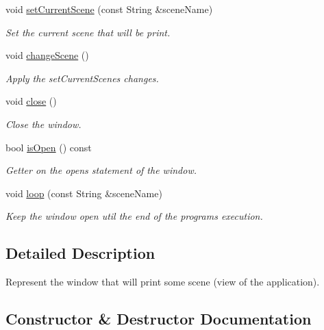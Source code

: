 \begin{DoxyCompactItemize}
void \hyperlink{classWindow_a3342dc02339a5974d5c6fcefd91d0cbf}{set\+Current\+Scene} (const String \&scene\+Name)
\begin{DoxyCompactList}\small\item\em Set the current scene that will be print. \end{DoxyCompactList}\item 
\mbox{\label{classWindow_af1b2a635ce47d9e841445b8b866a3b28}} 
void \hyperlink{classWindow_af1b2a635ce47d9e841445b8b866a3b28}{change\+Scene} ()
\begin{DoxyCompactList}\small\item\em Apply the set\+Current\+Scene\textquotesingle{}s changes. \end{DoxyCompactList}\item 
\mbox{\label{classWindow_a35055c04498121d39741bfcd5082705b}} 
void \hyperlink{classWindow_a35055c04498121d39741bfcd5082705b}{close} ()
\begin{DoxyCompactList}\small\item\em Close the window. \end{DoxyCompactList}\item 
bool \hyperlink{classWindow_a761d614931fb5a5daa70e4f580c3e78e}{is\+Open} () const
\begin{DoxyCompactList}\small\item\em Getter on the open\textquotesingle{}s statement of the window. \end{DoxyCompactList}\item 
void \hyperlink{classWindow_a9c9f1fd6ebc2b93f16ca870487a4a4c6}{loop} (const String \&scene\+Name)
\begin{DoxyCompactList}\small\item\em Keep the window open util the end of the program\textquotesingle{}s execution. \end{DoxyCompactList}\end{DoxyCompactItemize}


\subsection{Detailed Description}
Represent the window that will print some scene (view of the application). 

\subsection{Constructor \& Destructor Documentation}
\mbox{\label{classWindow_a25fd6af55e81b781b132166f77daf77e}} 
